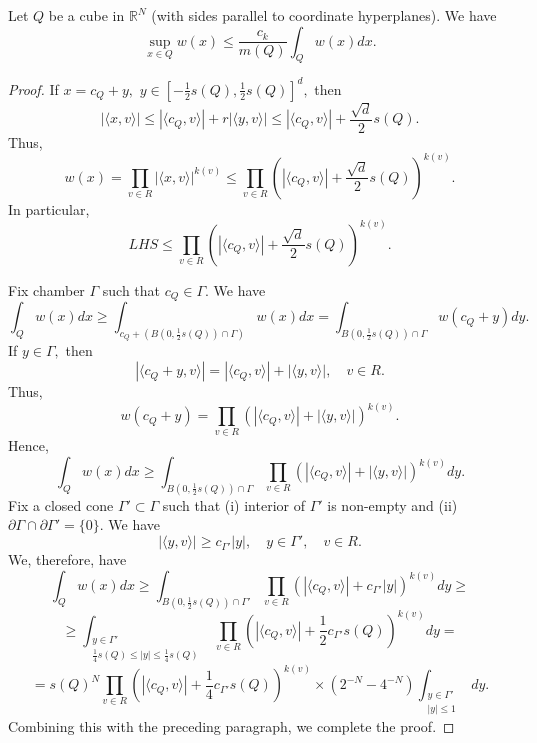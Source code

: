 \documentclass{amsart}
\numberwithin{equation}{section}
\begin{document}
\begin{lemma}\label{for reverse holder first lemma} Let $Q$ be a cube in $\mathbb{R}^N$ (with sides parallel to coordinate hyperplanes). We have
$$\sup_{x\in Q}w(x)\leq \frac{c_k}{m(Q)}\int_Qw(x)dx.$$
\end{lemma}
\begin{proof} If $x=c_Q+y,$ $y\in [-\frac12s(Q),\frac12s(Q)]^d,$ then
$$|\langle x,v\rangle|\leq |\langle c_Q,v\rangle|+r|\langle y,v\rangle|\leq |\langle c_Q,v\rangle|+\frac{\sqrt{d}}{2}s(Q).$$
Thus,
$$w(x)=\prod_{v\in R}|\langle x,v\rangle|^{k(v)}\leq\prod_{v\in R}(|\langle c_Q,v\rangle|+\frac{\sqrt{d}}{2}s(Q))^{k(v)}.$$
In particular,
$$LHS\leq \prod_{v\in R}(|\langle c_Q,v\rangle|+\frac{\sqrt{d}}{2}s(Q))^{k(v)}.$$

Fix chamber $\Gamma$ such that $c_Q\in\Gamma.$ We have
$$\int_Qw(x)dx\geq\int_{c_Q+(B(0,\frac12s(Q))\cap\Gamma)}w(x)dx=\int_{B(0,\frac12s(Q))\cap\Gamma}w(c_Q+y)dy.$$
If $y\in\Gamma,$ then
$$|\langle c_Q+y,v\rangle|=|\langle c_Q,v\rangle|+|\langle y,v\rangle|,\quad v\in R.$$
Thus,
$$w(c_Q+y)=\prod_{v\in R}(|\langle c_Q,v\rangle|+|\langle y,v\rangle|)^{k(v)}.$$
Hence,
$$\int_Qw(x)dx\geq\int_{B(0,\frac12s(Q))\cap\Gamma}\prod_{v\in R}(|\langle c_Q,v\rangle|+|\langle y,v\rangle|)^{k(v)}dy.$$
Fix a closed cone $\Gamma'\subset\Gamma$ such that (i) interior of $\Gamma'$ is non-empty and (ii) $\partial\Gamma\cap\partial\Gamma'=\{0\}.$ We have
$$|\langle y,v\rangle|\geq c_{\Gamma'}|y|,\quad y\in\Gamma',\quad v\in R.$$
We, therefore, have
$$\int_Qw(x)dx\geq\int_{B(0,\frac12s(Q))\cap\Gamma'}\prod_{v\in R}(|\langle c_Q,v\rangle|+c_{\Gamma'}|y|)^{k(v)}dy\geq$$
$$\geq \int_{\substack{y\in\Gamma'\\ \frac14s(Q)\leq|y|\leq \frac14s(Q)}}\prod_{v\in R}(|\langle c_Q,v\rangle|+\frac12c_{\Gamma'}s(Q))^{k(v)}dy=$$
$$=s(Q)^N\prod_{v\in R}(|\langle c_Q,v\rangle|+\frac14c_{\Gamma'}s(Q))^{k(v)}\times (2^{-N}-4^{-N})\int_{\substack{y\in\Gamma'\\ |y|\leq1}}dy.$$
Combining this with the preceding paragraph, we complete the proof.
\end{proof}
\end{document}
